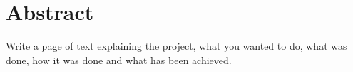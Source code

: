 \section*{Abstract}
Write a page of text explaining the project, what you wanted to do, what was done, how it was done and what has been achieved.